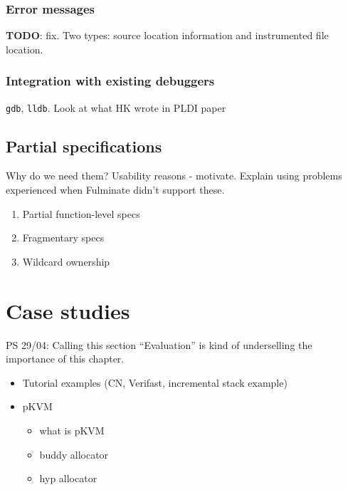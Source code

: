 \documentclass[withindex,glossary]{cam-thesis}
\begin{document}
\subsection{Error messages}

\textbf{TODO}: fix. Two types: source location information and instrumented file location.

\subsection{Integration with existing debuggers}

\texttt{gdb}, \texttt{lldb}. Look at what HK wrote in PLDI paper 

\section{Partial specifications}

Why do we need them? Usability reasons - motivate. Explain using problems experienced when Fulminate didn't support these.

\begin{enumerate}
  \item Partial function-level specs
  \item Fragmentary specs
  \item Wildcard ownership
\end{enumerate}




\chapter{Case studies}

PS 29/04: Calling this section ``Evaluation'' is kind of underselling the importance of this chapter.

\begin{itemize}
  \item Tutorial examples (CN, Verifast, incremental stack example)
  \item pKVM
  \begin{itemize}
    \item what is pKVM
    \item buddy allocator
    \item hyp allocator
  \end{itemize}
\end{itemize}



\end{document}
